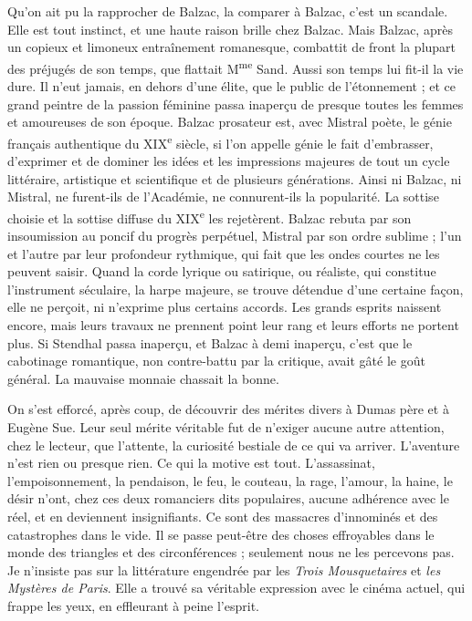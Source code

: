 \documentclass[french,twoside]{book} %
\begin{document}
Qu’on ait pu la rapprocher de Balzac, la comparer à Balzac, c’est un scandale. Elle est tout instinct, et une haute raison brille chez Balzac. Mais Balzac, après un copieux et limoneux entraînement romanesque, combattit de front la plupart des préjugés de son temps, que flattait M\textsuperscript{me} Sand. Aussi son temps lui fit-il la vie dure. Il n’eut jamais, en dehors d’une élite, que le public de l’étonnement ; et ce grand peintre de la passion féminine passa inaperçu de presque toutes les femmes et amoureuses de son époque. Balzac prosateur est, avec Mistral poète, le génie français authentique du XIX\textsuperscript{e} siècle, si l’on appelle génie le fait d’embrasser, d’exprimer et de dominer les idées et les impressions majeures de tout un cycle littéraire, artistique et scientifique et de plusieurs générations. Ainsi ni Balzac, ni Mistral, ne furent-ils de l’Académie, ne connurent-ils la popularité. La sottise choisie et la sottise diffuse du XIX\textsuperscript{e} les rejetèrent. Balzac rebuta par son insoumission au poncif du progrès perpétuel, Mistral par son ordre sublime ; l’un et l’autre par leur profondeur rythmique, qui fait que les ondes courtes ne les peuvent saisir. Quand la corde lyrique ou satirique, ou réaliste, qui constitue l’instrument séculaire, la harpe majeure, se trouve détendue d’une certaine façon, elle ne perçoit, ni n’exprime plus certains accords. Les grands esprits naissent encore, mais leurs travaux ne prennent point leur rang et leurs efforts ne portent plus. Si Stendhal passa inaperçu, et Balzac à demi inaperçu, c’est que le cabotinage romantique, non contre-battu par la critique, avait gâté le goût général. La mauvaise monnaie chassait la bonne.\par
On s’est efforcé, après coup, de découvrir des mérites divers à Dumas père et à Eugène Sue. Leur seul mérite véritable fut de n’exiger aucune autre attention, chez le lecteur, que l’attente, la curiosité bestiale de ce qui va arriver. L’aventure n’est rien ou presque rien. Ce qui la motive est tout. L’assassinat, l’empoisonnement, la pendaison, le feu, le couteau, la rage, l’amour, la haine, le désir n’ont, chez ces deux romanciers dits populaires, aucune adhérence avec le réel, et en deviennent insignifiants. Ce sont des massacres d’innominés et des catastrophes dans le vide. Il se passe peut-être des choses effroyables dans le monde des triangles et des circonférences ; seulement nous ne les percevons pas. Je n’insiste pas sur la littérature engendrée par les {\itshape Trois Mousquetaires} et {\itshape les Mystères de Paris}. Elle a trouvé sa véritable expression avec le cinéma actuel, qui frappe les yeux, en effleurant à peine l’esprit.\par
\end{document}

